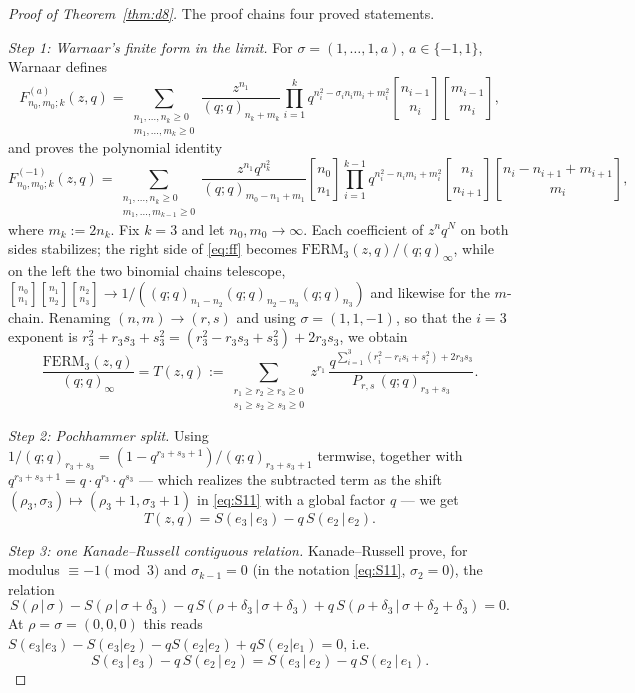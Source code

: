 \documentclass[11pt]{article}
\newcommand{\qbin}[2]{\genfrac{[}{]}{0pt}{}{#1}{#2}}
\newcommand{\poch}[1]{(q;q)_{#1}}
\newcommand{\FERM}{\mathrm{FERM}}
\begin{document}
\begin{proof}[Proof of Theorem~\ref{thm:d8}]
The proof chains four proved statements.

\emph{Step 1: Warnaar's finite form in the limit.}
For $\sigma=(1,\dots,1,a)$, $a\in\{-1,1\}$, Warnaar defines
\cite[Eqs.~(7.1),(7.2)]{W23}
\[
F^{(a)}_{n_0,m_0;k}(z,q)=
\sum_{\substack{n_1,\dots,n_k\ge 0\\ m_1,\dots,m_k\ge 0}}
\frac{z^{n_1}}{\poch{n_k+m_k}}
\prod_{i=1}^{k}q^{n_i^2-\sigma_in_im_i+m_i^2}
\qbin{n_{i-1}}{n_i}\qbin{m_{i-1}}{m_i},
\]
and proves \cite[Proposition~7.1, case $a=-1$]{W23} the polynomial
identity
\begin{equation}\label{eq:ff}
F^{(-1)}_{n_0,m_0;k}(z,q)=
\sum_{\substack{n_1,\dots,n_k\ge 0\\ m_1,\dots,m_{k-1}\ge 0}}
\frac{z^{n_1}q^{n_k^2}}{\poch{m_0-n_1+m_1}}\qbin{n_0}{n_1}
\prod_{i=1}^{k-1}q^{n_i^2-n_im_i+m_i^2}
\qbin{n_i}{n_{i+1}}\qbin{n_i-n_{i+1}+m_{i+1}}{m_i},
\end{equation}
where $m_k:=2n_k$. Fix $k=3$ and let $n_0,m_0\to\infty$. Each coefficient
of $z^nq^N$ on both sides stabilizes; the right side of \eqref{eq:ff}
becomes $\FERM_3(z,q)/\poch{\infty}$, while on the left the two binomial
chains telescope,
$\qbin{n_0}{n_1}\qbin{n_1}{n_2}\qbin{n_2}{n_3}\to
1/(\poch{n_1-n_2}\poch{n_2-n_3}\poch{n_3})$ and likewise for the
$m$-chain. Renaming $(n,m)\to(r,s)$ and using $\sigma=(1,1,-1)$, so that
the $i=3$ exponent is $r_3^2+r_3s_3+s_3^2=(r_3^2-r_3s_3+s_3^2)+2r_3s_3$,
we obtain
\begin{equation}\label{eq:T}
\frac{\FERM_3(z,q)}{\poch{\infty}}=T(z,q):=
\sum_{\substack{r_1\ge r_2\ge r_3\ge 0\\ s_1\ge s_2\ge s_3\ge 0}}
z^{r_1}\,
\frac{q^{\sum_{i=1}^{3}(r_i^2-r_is_i+s_i^2)+2r_3s_3}}
{P_{r,s}\,\poch{r_3+s_3}} .
\end{equation}

\emph{Step 2: Pochhammer split.}
Using $1/\poch{r_3+s_3}=(1-q^{r_3+s_3+1})/\poch{r_3+s_3+1}$ termwise,
together with $q^{r_3+s_3+1}=q\cdot q^{r_3}\cdot q^{s_3}$ --- which
realizes the subtracted term as the shift
$(\rho_3,\sigma_3)\mapsto(\rho_3+1,\sigma_3+1)$ in \eqref{eq:S11} with a
global factor $q$ --- we get
\begin{equation}\label{eq:split}
T(z,q)=S(e_3\,|\,e_3)-q\,S(e_2\,|\,e_2).
\end{equation}

\emph{Step 3: one Kanade--Russell contiguous relation.}
Kanade--Russell \cite[Lemma~9.2]{KR22} prove, for modulus
$\equiv-1\pmod 3$ and $\sigma_{k-1}=0$ (in the notation
\eqref{eq:S11}, $\sigma_2=0$), the relation
\[
S(\rho\,|\,\sigma)-S(\rho\,|\,\sigma+\delta_3)
-q\,S(\rho+\delta_3\,|\,\sigma+\delta_3)
+q\,S(\rho+\delta_3\,|\,\sigma+\delta_2+\delta_3)=0 .
\]
At $\rho=\sigma=(0,0,0)$ this reads
$S(e_3|e_3)-S(e_3|e_2)-qS(e_2|e_2)+qS(e_2|e_1)=0$, i.e.
\begin{equation}\label{eq:bridge}
S(e_3\,|\,e_3)-q\,S(e_2\,|\,e_2)=S(e_3\,|\,e_2)-q\,S(e_2\,|\,e_1).
\end{equation}


\end{proof}
\end{document}
